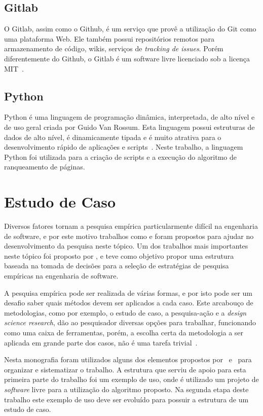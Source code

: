\subsection{Gitlab}
\label{met:tec:gitlab}
O Gitlab, assim como o Github, é um serviço que provê a utilização do Git como uma plataforma Web. Ele também possui repositórios remotos para armazenamento de código, wikis, serviços de \textit{tracking de issues}. Porém diferentemente do Github, o Gitlab é um software livre licenciado sob a licença MIT~\cite{gitlab}.

\subsection{Python}
\label{met:tec:python}
Python é uma linguagem de programação dinâmica, interpretada, de alto nível e de  uso geral criada por Guido Van Rossum. Esta linguagem possui estruturas de dados de alto nível, é dinamicamente tipada e é muito atrativa para o desenvolvimento rápido de aplicações e scripts~\cite{python}. Neste trabalho, a linguagem Python foi utilizada para a criação de scripts e a execução do algoritmo de ranqueamento de páginas.


\section{Estudo de Caso}
\label{met:est}

Diversos fatores tornam a pesquisa empírica particularmente difícil na engenharia de software, e por este motivo trabalhos como  \cite{shaw} e \cite{empiricalSoftware} foram propostos para ajudar no desenvolvimento da pesquisa neste tópico. Um dos trabalhos mais importantes neste tópico foi proposto por \cite{empiricalSoftware}, e teve como objetivo propor uma estrutura baseada na tomada de decisões para a seleção de estratégias de pesquisa empíricas na engenharia de software.

A pesquisa empírica pode ser realizada de várias formas, e por isto pode ser um desafio saber quais métodos devem ser aplicados a cada caso. Este arcabouço de metodologias, como por exemplo, o estudo de caso, a pesquisa-ação e a \textit{design science research}, dão ao pesquisador diversas opções para trabalhar, funcionando como uma caixa de ferramentas, porém, a escolha certa da metodologia a ser aplicada em grande parte dos casos, não é uma tarefa trivial~\cite{empiricalSoftware}.

Nesta monografia foram utilizados alguns dos elementos propostos por~\cite{shaw} e~\cite{empiricalSoftware} para organizar e sistematizar o trabalho. A estrutura que serviu de apoio para esta primeira parte do trabalho foi um exemplo de uso, onde é utilizado um projeto de \textit{software} livre para a utilização do algoritmo proposto. Na segunda etapa deste trabalho este exemplo de uso deve ser evoluído para possuir a estrutura de um estudo de caso.

